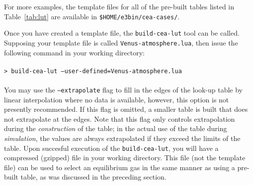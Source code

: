 For more examples, the template files for all of the pre-built tables listed in Table~\ref{tab:lut} are available in
\texttt{\$HOME/e3bin/cea-cases/}.

Once you have created a template file, the \texttt{build-cea-lut} tool can be called.
Supposing your template file is called \texttt{Venus-atmosphere.lua}, then issue
the following command in your working directory:\\
\topbar\\
\texttt{> build-cea-lut --user-defined=Venus-atmosphere.lua} \\
\bottombar\\
You may use the \texttt{--extrapolate} flag to fill in the edges
of the look-up table by linear interpolation where no data is available, however, this option
is not presently recommended.
If this flag is omitted, a smaller table is built that does not extrapolate at the edges.
Note that this flag only controls extrapolation during the \textit{construction} of the table; in 
the actual use of the table during \textit{simulation}, the values are always extrapolated
if they exceed the limits of the table.
Upon succesful execution of the \texttt{build-cea-lut}, you will have a compressed (gzipped)
file in your working directory.
This file (not the template file) can be used to select an equilibrium gas in the
same manner as using a pre-built table, as was discussed in the preceding section. 

